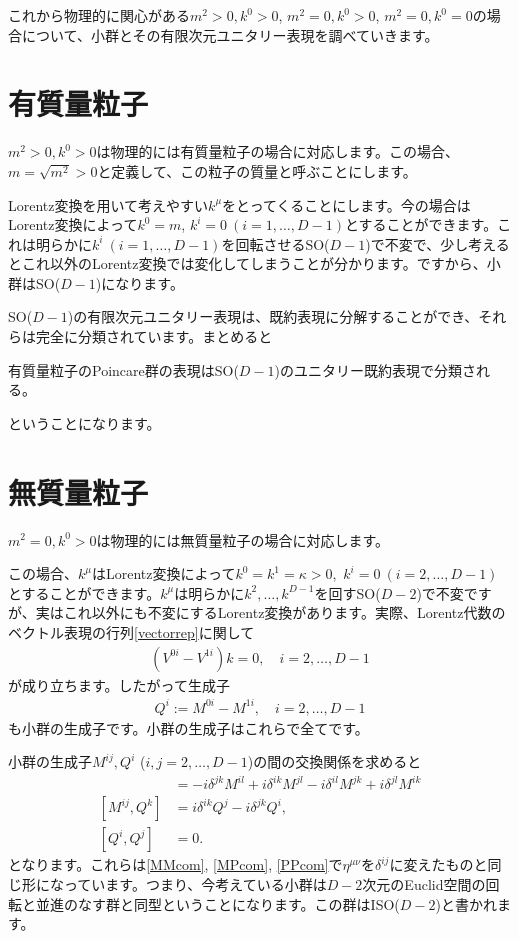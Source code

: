 \documentclass[report,paper=a4, fontsize=12pt, line_length=16cm, number_of_lines=34,dvipdfmx]{jlreq}
\newenvironment{important}{\begin{tcolorbox}[
  colback = white,
  colframe = red!35,
  boxrule = 2mm,
  fonttitle = \bfseries,
  after = \noindent] }{\end{tcolorbox}}
\numberwithin{equation}{chapter}
\numberwithin{equation}{section}
\begin{document}
これから物理的に関心がある$m^2>0,k^{0}>0$, $m^2=0,k^{0}>0$, $m^2=0,k^{0}=0$の場合について、小群とその有限次元ユニタリー表現を調べていきます。

\section{有質量粒子}
$m^2>0,k^{0}>0$は物理的には有質量粒子の場合に対応します。この場合、$m=\sqrt{m^2}>0$と定義して、この粒子の質量と呼ぶことにします。

Lorentz変換を用いて考えやすい$k^{\mu}$をとってくることにします。今の場合はLorentz変換によって$k^0=m$, $k^i=0\ (i=1,\dots, D-1)$とすることができます。これは明らかに$k^i\ (i=1,\dots,D-1)$を回転させるSO($D-1$)で不変で、少し考えるとこれ以外のLorentz変換では変化してしまうことが分かります。ですから、小群はSO($D-1$)になります。

SO($D-1$)の有限次元ユニタリー表現は、既約表現に分解することができ、それらは完全に分類されています。まとめると
\begin{important}
有質量粒子のPoincare群の表現はSO($D-1$)のユニタリー既約表現で分類される。
\end{important}
ということになります。

\section{無質量粒子}
$m^2=0,k^{0}>0$は物理的には無質量粒子の場合に対応します。

この場合、$k^{\mu}$はLorentz変換によって$k^{0}=k^{1}=\kappa>0$,\ $k^{i}=0
\ (i=2,\dots,D-1)$とすることができます。$k^{\mu}$は明らかに$k^2,\dots,k^{D-1}$を回すSO($D-2$)で不変ですが、実はこれ以外にも不変にするLorentz変換があります。実際、Lorentz代数のベクトル表現の行列\eqref{vectorrep}に関して
\begin{align}
  (V^{0i}-V^{1i})k = 0,\quad i=2,\dots,D-1
\end{align}
が成り立ちます。したがって生成子
\begin{align}
  Q^{i}:=M^{0i}-M^{1i},\quad i=2,\dots,D-1
\end{align}
も小群の生成子です。小群の生成子はこれらで全てです。

小群の生成子$M^{ij},Q^{i}$ ($i,j=2,\dots, D-1$)の間の交換関係を求めると
\begin{align}
  [M^{ij},M^{kl}]&=-i\delta^{jk}M^{il}+i\delta^{ik}M^{jl}-i\delta^{il}M^{jk}+i\delta^{jl}M^{ik}\\
  [M^{ij},Q^{k}]&=i\delta^{ik}Q^{j}-i\delta^{jk}Q^{i}
  ,\\
  [Q^i,Q^j]&=0.
\end{align}
となります。これらは\eqref{MMcom}, \eqref{MPcom}, \eqref{PPcom}で$\eta^{\mu\nu}$を$\delta^{ij}$に変えたものと同じ形になっています。つまり、今考えている小群は$D-2$次元のEuclid空間の回転と並進のなす群と同型ということになります。この群はISO($D-2$)と書かれます。
\end{document}
